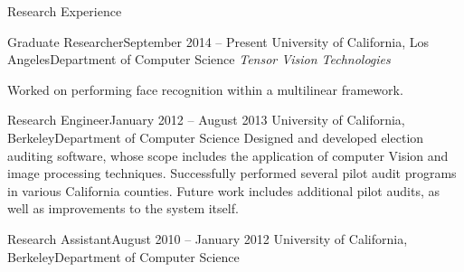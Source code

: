 \documentclass{resume}
\begin{document}
\vspace{0.5em}

\begin{component}{Research Experience}
    \begin{position}{Graduate Researcher}{September 2014 -- Present}
        {University of California, Los Angeles}{Department of Computer Science}
    \emph{Tensor Vision Technologies}

    {Worked on performing face recognition within a multilinear framework.}
    \end{position}

    \begin{position}{Research Engineer}{January 2012 -- August 2013}
        {University of California, Berkeley}{Department of Computer Science}
    {Designed and developed election auditing software, whose scope includes the application of computer Vision and image processing techniques. Successfully performed several pilot audit programs in various California counties. Future work includes additional pilot audits, as well as improvements to the system itself.}
    \end{position}
    
    \begin{position}{Research Assistant}{August 2010 -- January 2012}
        {University of California, Berkeley}{Department of Computer Science}
    {}
    \end{position}
\end{component}

\vspace{-1.5em}


\vspace{0.5em}
\end{document}

